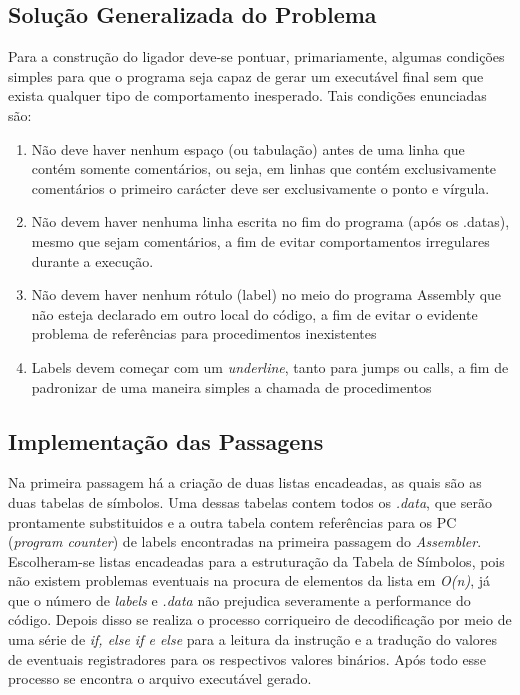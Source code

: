 \documentclass{article}
\begin{document}
\subsection{Solução Generalizada do Problema}
Para a construção do ligador deve-se pontuar, primariamente, algumas condições simples para que o programa seja capaz de gerar um executável final sem que exista qualquer tipo de comportamento inesperado. Tais condições enunciadas são:

\begin{enumerate}
  \item Não deve haver nenhum espaço (ou tabulação) antes de uma linha que contém somente comentários, ou seja, em linhas que contém exclusivamente comentários o primeiro carácter deve ser exclusivamente o ponto e vírgula.
  \item Não devem haver nenhuma linha escrita no fim do programa (após os .datas), mesmo que sejam comentários, a fim de evitar comportamentos irregulares durante a execução.
  \item Não devem haver nenhum rótulo (label) no meio do programa Assembly que não esteja declarado em outro local do código, a fim de evitar o evidente problema de referências para procedimentos inexistentes
  \item Labels devem começar com um \textit{underline}, tanto para jumps ou calls, a fim de padronizar de uma maneira simples a chamada de procedimentos
\end{enumerate}


\subsection{Implementação das Passagens}
Na primeira passagem há a criação de duas listas encadeadas, as quais são as duas tabelas de símbolos. Uma dessas tabelas contem todos os \textit{.data}, que serão prontamente substituidos e a outra tabela contem referências para os PC (\textit{program counter}) de labels encontradas na primeira passagem do \textit{Assembler}. Escolheram-se listas encadeadas para a estruturação da Tabela de Símbolos, pois não existem problemas eventuais na procura de elementos da lista em \textit{O(n)}, já que o número de \textit{labels} e \textit{.data} não prejudica severamente a performance do código.
Depois disso se realiza o processo corriqueiro de decodificação por meio de uma série de \textit{if, else if e else} para a leitura da instrução e a tradução do valores de eventuais registradores para os respectivos valores binários. Após todo esse processo se encontra o arquivo executável gerado.
\end{document}
